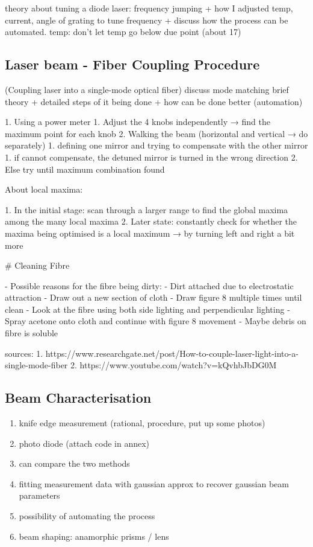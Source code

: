 \documentclass[11pt,A4Paper]{article}
\begin{document}
\cite{compactGratingDiodeLaser}theory about tuning a diode laser: frequency jumping + how I adjusted temp, current, angle of grating to tune frequency + discuss how the process can be automated.
temp: don't let temp go below due point (about 17) 


\subsection{Laser beam - Fiber Coupling Procedure}
(Coupling laser into a single-mode optical fiber) 
discuss mode matching
brief theory + detailed steps of it being done + how can be done better (automation) 
    
1. Using a power meter 
    1. Adjust the 4 knobs independently → find the maximum point for each knob
    2. Walking the beam (horizontal and vertical → do separately)
        1. defining one mirror and trying to compensate with the other mirror 
            1. if cannot compensate, the detuned mirror is turned in the wrong direction
            2. Else try until maximum combination found

About local maxima: 

1. In the initial stage: scan through a larger range to find the global maxima among the many local maxima 
2. Later state: constantly check for whether the maxima being optimised is a local maximum → by turning left and right a bit more

# Cleaning Fibre

- Possible reasons for the fibre being dirty:
    - Dirt attached due to electrostatic attraction
- Draw out a new section of cloth
- Draw figure 8 multiple times until clean
- Look at the fibre using both side lighting and perpendicular lighting
- Spray acetone onto cloth and continue with figure 8 movement
    - Maybe debris on fibre is soluble

sources: 
1. https://www.researchgate.net/post/How-to-couple-laser-light-into-a-single-mode-fiber
2. https://www.youtube.com/watch?v=kQvhbJbDG0M


\subsection{Beam Characterisation}
\begin{enumerate}
    \item knife edge measurement (rational, procedure, put up some photos)
    \item photo diode (attach code in annex)
    \item can compare the two methods
    \item fitting measurement data with gaussian approx to recover gaussian beam parameters 
    \item possibility of automating the process
    \item beam shaping: anamorphic prisms / lens
\end{enumerate}
\end{document}
